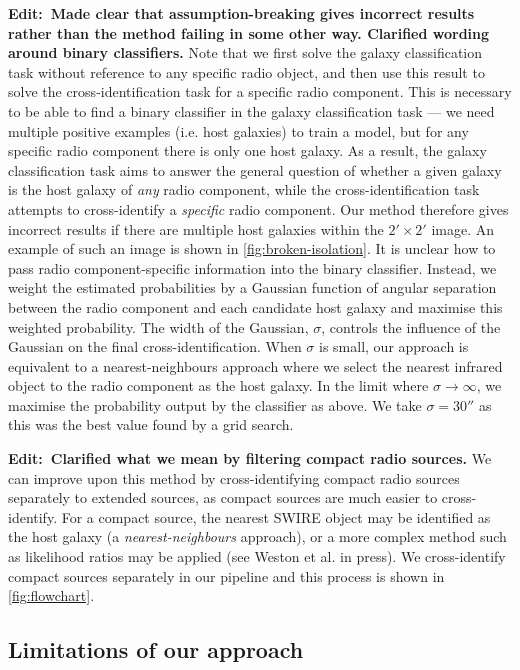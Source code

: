 \documentclass[fleqn,usenatbib,usedcolumn]{mnras}
\newcommand{\edit}[1]{{\bf Edit:~{#1}}}
\begin{document}
    \edit{Made clear that assumption-breaking gives incorrect results rather than the method failing in some other way. Clarified wording around binary classifiers.} Note that we first solve the galaxy classification task without reference to any specific radio object, and then use this result to solve the cross-identification task for a specific radio component. This is necessary to be able to find a binary classifier in the galaxy classification task --- we need multiple positive examples (i.e. host galaxies) to train a model, but for any specific radio component there is only one host galaxy. As a result, the galaxy classification task aims to answer the general question of whether a given galaxy is the host galaxy of \emph{any} radio component, while the cross-identification task attempts to cross-identify a \emph{specific} radio component. Our method therefore gives incorrect results if there are multiple host galaxies within the $2' \times 2'$ image. An example of such an image is shown in \autoref{fig:broken-isolation}. It is unclear how to pass radio component-specific information into the binary classifier. Instead, we weight the estimated probabilities by a Gaussian function of angular separation between the radio component and each candidate host galaxy and maximise this weighted probability. The width of the Gaussian, $\sigma$, controls the influence of the Gaussian on the final cross-identification. When $\sigma$ is small, our approach is equivalent to a nearest-neighbours approach where we select the nearest infrared object to the radio component as the host galaxy. In the limit where $\sigma \to \infty$, we maximise the probability output by the classifier as above. We take $\sigma = 30''$ as this was the best value found by a grid search.

    \edit{Clarified what we mean by filtering compact radio sources.} We can improve upon this method by cross-identifying compact radio sources separately to extended sources, as compact sources are much easier to cross-identify. For a compact source, the nearest SWIRE object may be identified as the host galaxy (a \emph{nearest-neighbours} approach), or a more complex method such as likelihood ratios may be applied (see Weston et al. in press). We cross-identify compact sources separately in our pipeline and this process is shown in \autoref{fig:flowchart}.

  \subsection{Limitations of our approach}
    \label{sec:limitations}
\end{document}
